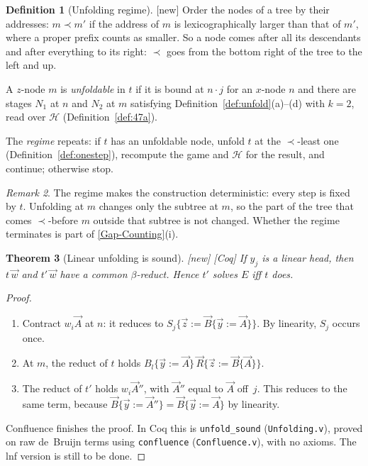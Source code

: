 \documentclass[11pt]{article}
\newcommand{\suc}[2]{#1{\cdot}#2}
\newcommand{\New}{\textsf{[new]}}
\newcommand{\Coq}{\textsf{[Coq]}}
\theoremstyle{plain}
\newtheorem{theorem}{Theorem}[section]
\theoremstyle{definition}
\newtheorem{definition}[theorem]{Definition}
\theoremstyle{remark}
\newtheorem{remark}[theorem]{Remark}
\newcommand{\GapCounting}{\hyperref[gap:count]{[Gap-Counting]}}
\begin{document}
\begin{definition}[Unfolding regime]\label{def:regime}
\New{} Order the nodes of a tree by their addresses: $m\prec m'$ if the
address of $m$ is lexicographically larger than that of $m'$, where a
proper prefix counts as smaller.  So a node comes after all its
descendants and after everything to its right: $\prec$ goes from the
bottom right of the tree to the left and up.

A $z$-node $m$ is \emph{unfoldable} in $t$ if it is bound at $\suc nj$
for an $x$-node $n$ and there are stages $N_1$ at $n$ and $N_2$ at $m$
satisfying Definition~\ref{def:unfold}(a)--(d) with $k=2$, read over
$\mathcal H$ (Definition~\ref{def:47a}).

The \emph{regime} repeats: if $t$ has an unfoldable node, unfold $t$ at
the $\prec$-least one (Definition~\ref{def:onestep}), recompute the
game and $\mathcal H$ for the result, and continue; otherwise stop.
\end{definition}

\begin{remark}
The regime makes the construction deterministic: every step is fixed
by $t$.  Unfolding at $m$ changes only the subtree at $m$, so the part
of the tree that comes $\prec$-before $m$ outside that subtree is not
changed.  Whether the regime terminates is part of \GapCounting{}(i).
\end{remark}

\begin{theorem}[Linear unfolding is sound]\label{thm:linunfold}
\New{} \Coq{} If $y_j$ is a linear head, then $t\,\vec w$ and
$t'\,\vec w$ have a common $\beta$-reduct.  Hence $t'$ solves $E$ iff
$t$ does.
\end{theorem}
\begin{proof}
\begin{enumerate}
\item Contract $w_i\vec A$ at $n$: it reduces to
  $S_j\{\vec z:=\vec B\{\vec y:=\vec A\}\}$.  By linearity, $S_j$
  occurs once.
\item At $m$, the reduct of $t$ holds
  $B_l\{\vec y:=\vec A\}\,\vec R\{\vec z:=\vec B\{\vec A\}\}$.
\item The reduct of $t'$ holds $w_i\vec A''$, with $\vec A''$ equal to
  $\vec A$ off~$j$.  This reduces to the same term, because
  $\vec B\{\vec y:=\vec A''\}=\vec B\{\vec y:=\vec A\}$ by linearity.
\end{enumerate}
Confluence finishes the proof.  In Coq this is \texttt{unfold\_sound}
(\texttt{Unfolding.v}), proved on raw de~Bruijn terms using
\texttt{confluence} (\texttt{Confluence.v}), with no axioms.  The lnf
version is still to be done.
\end{proof}
\end{document}
